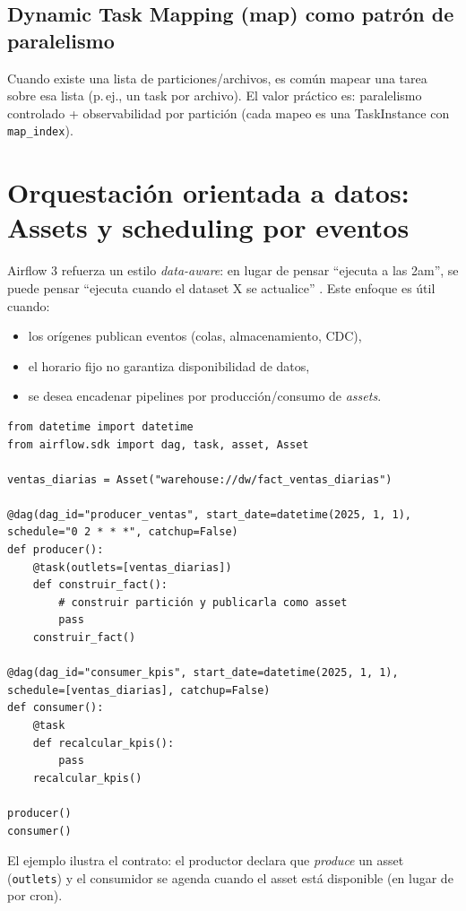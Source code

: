\subsection{Dynamic Task Mapping (map) como patrón de paralelismo}
Cuando existe una lista de particiones/archivos, es común mapear una tarea sobre esa lista (p.\,ej., un task por archivo). El valor práctico es: paralelismo controlado + observabilidad por partición (cada mapeo es una TaskInstance con \texttt{map\_index}).

\section{Orquestación orientada a datos: Assets y scheduling por eventos}
Airflow 3 refuerza un estilo \textit{data-aware}: en lugar de pensar ``ejecuta a las 2am'', se puede pensar ``ejecuta cuando el dataset X se actualice'' \cite{airflow_blog_3_ga,airflow_release_notes_3}. Este enfoque es útil cuando:
\begin{itemize}[leftmargin=*]
  \item los orígenes publican eventos (colas, almacenamiento, CDC),
  \item el horario fijo no garantiza disponibilidad de datos,
  \item se desea encadenar pipelines por producción/consumo de \textit{assets}.
\end{itemize}

\begin{lstlisting}[style=python,caption={Ejemplo conceptual de asset como contrato de datos (Airflow 3.x)}]
from datetime import datetime
from airflow.sdk import dag, task, asset, Asset

ventas_diarias = Asset("warehouse://dw/fact_ventas_diarias")

@dag(dag_id="producer_ventas", start_date=datetime(2025, 1, 1), schedule="0 2 * * *", catchup=False)
def producer():
    @task(outlets=[ventas_diarias])
    def construir_fact():
        # construir partición y publicarla como asset
        pass
    construir_fact()

@dag(dag_id="consumer_kpis", start_date=datetime(2025, 1, 1), schedule=[ventas_diarias], catchup=False)
def consumer():
    @task
    def recalcular_kpis():
        pass
    recalcular_kpis()

producer()
consumer()
\end{lstlisting}
El ejemplo ilustra el contrato: el productor declara que \textit{produce} un asset (\texttt{outlets}) y el consumidor se agenda cuando el asset está disponible (en lugar de por cron).


